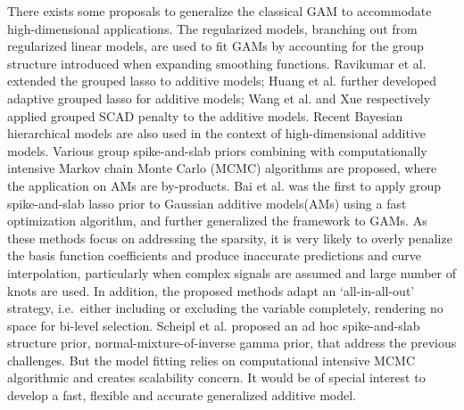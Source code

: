 \documentclass[AMA,STIX1COL,]{WileyNJD-v2}
\begin{document}
There exists some proposals to generalize the classical GAM to
accommodate high-dimensional applications. The regularized models,
branching out from regularized linear models, are used to fit GAMs by
accounting for the group structure introduced when expanding smoothing
functions. Ravikumar et al. \citep{Ravikumar2009} extended the grouped
lasso \citep{Yuan2006} to additive models; Huang et al.
\citep{Huang2010} further developed adaptive grouped lasso for additive
models; Wang et al. \citep{Wang2007} and Xue \citep{Xue2009}
respectively applied grouped SCAD penalty \citep{Fan2001} to the
additive models. Recent Bayesian hierarchical models are also used in
the context of high-dimensional additive models. Various group
spike-and-slab priors combining with computationally intensive Markov
chain Monte Carlo (MCMC) algorithms \citep{Xu2015, Yang2020} are
proposed, where the application on AMs are by-products. Bai et al.
\citep{Bai2020} was the first to apply group spike-and-slab lasso prior
to Gaussian additive models(AMs) using a fast optimization algorithm,
and further generalized the framework to GAMs\citep{Bai2021}. As these
methods focus on addressing the sparsity, it is very likely to overly
penalize the basis function coefficients and produce inaccurate
predictions and curve interpolation, particularly when complex signals
are assumed and large number of knots are used. \citep{Scheipl2013} In
addition, the proposed methods adapt an `all-in-all-out' strategy,
i.e.~either including or excluding the variable completely, rendering no
space for bi-level selection. Scheipl et al. \citep{Scheipl2012}
proposed an ad hoc spike-and-slab structure prior,
normal-mixture-of-inverse gamma prior, that address the previous
challenges. But the model fitting relies on computational intensive MCMC
algorithmic and creates scalability concern. It would be of special
interest to develop a fast, flexible and accurate generalized additive
model.
\end{document}
